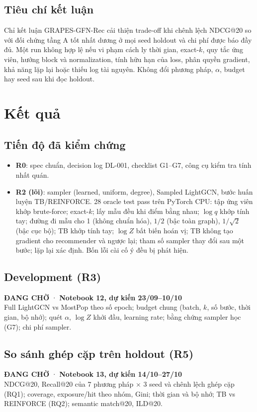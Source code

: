 \documentclass[11pt,a4paper,oneside]{report}
\newcommand{\pending}[2]{\begin{tcolorbox}[colback=amberpale,colframe=amber,boxrule=0.8pt,arc=2pt,left=6pt,right=6pt,top=4pt,bottom=4pt,fontupper=\small]\textbf{\color{coral}ĐANG CHỜ} · \textbf{#1}\\ #2\end{tcolorbox}}
\begin{document}
\section{Tiêu chí kết luận}
Chỉ kết luận GRAPES-GFN-Rec cải thiện trade-off khi chênh lệch NDCG@20 so với đối chứng tầng A tốt nhất dương ở mọi seed holdout và chi phí được báo đầy đủ. Một run không hợp lệ nếu vi phạm cách ly thời gian, exact-$k$, quy tắc ứng viên, hướng block và normalization, tính hữu hạn của loss, phân quyền gradient, khả năng lặp lại hoặc thiếu log tài nguyên. Không đổi phương pháp, $\alpha$, budget hay seed sau khi đọc holdout.


\chapter{Kết quả}\label{ch:results}

\section{Tiến độ đã kiểm chứng}
\begin{itemize}
\item \textbf{R0}: spec chuẩn, decision log DL-001, checklist G1--G7, công cụ kiểm tra tính nhất quán.
\item \textbf{R2 (lõi)}: sampler (learned, uniform, degree), Sampled LightGCN, bước huấn luyện TB/REINFORCE. 28 oracle test pass trên PyTorch CPU: tập ứng viên khớp brute-force; exact-$k$; lấy mẫu đều khi điểm bằng nhau; $\log q$ khớp tính tay; đường đi mẫu cho 1 (không chuẩn hóa), $1/2$ (bậc toàn graph), $1/\sqrt{2}$ (bậc cục bộ); TB khớp tính tay; $\log Z$ bất biến hoán vị; TB không tạo gradient cho recommender và ngược lại; tham số sampler thay đổi sau một bước; lặp lại xác định. Bốn lỗi cài cố ý đều bị phát hiện.
\end{itemize}

\section{Development (R3)}
\pending{Notebook 12, dự kiến 23/09--10/10}{Full LightGCN vs MostPop theo số epoch; budget chung (batch, $k$, số bước, thời gian, bộ nhớ); quét $\alpha$, $\log Z$ khởi đầu, learning rate; bằng chứng sampler học (G7); chi phí sampler.}

\section{So sánh ghép cặp trên holdout (R5)}
\pending{Notebook 13, dự kiến 14/10--27/10}{NDCG@20, Recall@20 của 7 phương pháp $\times$ 3 seed và chênh lệch ghép cặp (RQ1); coverage, exposure/hit theo nhóm, Gini; thời gian và bộ nhớ; TB vs REINFORCE (RQ2); semantic match@20, ILD@20.}
\end{document}
